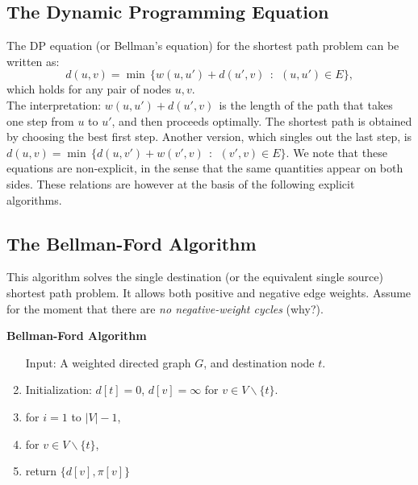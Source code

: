 \subsection{The Dynamic Programming Equation}
The DP equation (or Bellman's equation) for the shortest path problem can be written as:
\[d(u,v) = \min \,\{ w(u,u') + d(u',v)\,\;:\,\;(u,u') \in E\}, \]
which holds for any pair of nodes $u,v$.
\\
The interpretation: $w(u,u') + d(u',v)\,\;$is the length of the path that takes one step from $u$ to $u'$, and then proceeds optimally. The shortest path is obtained by choosing the best first step.
Another version, which singles out the last step, is
$d(u,v) = \min \,\{ d(u,v') + w(v',v)\,\;:\,\;(v',v) \in E\} $.
We note that these equations are non-explicit, in the sense that the same quantities appear on both sides.  These relations are however at the basis of the following explicit algorithms.

\subsection{The Bellman-Ford Algorithm}
This algorithm solves the single destination (or the equivalent single source) shortest path problem. It allows both positive and negative edge weights. Assume for the moment that there are \emph{no negative-weight cycles} (why?).

\begin{algorithm_}\textbf{Bellman-Ford Algorithm}
\begin{enumerate}
\item[ Input: ] A weighted directed graph $G$, and destination node $t$.

\item Initialization:   $d[t] = 0$,  $d[v] = \infty $ for $v \in V\backslash \{ t\} $.
                           \\

\item for  $i = 1$ to $|V| - 1$,




\item for  $v \in V\backslash \{ t\} $,





\item return $\{ d[v],\pi [v]\} $
\end{enumerate}
\end{algorithm_}

